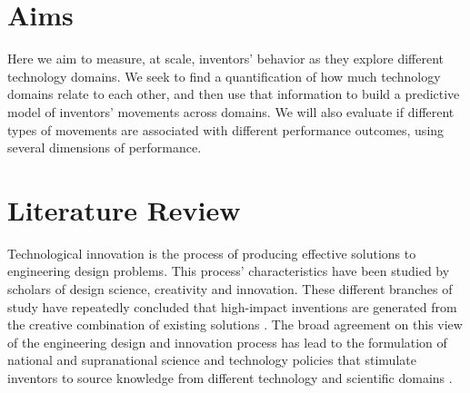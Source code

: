 \documentclass{dsj}
\begin{document}
\section*{Aims}
Here we aim to measure, at scale, inventors' behavior as they explore different technology domains. We seek to find a quantification of how much technology domains relate to each other, and then use that information to build a predictive model of inventors' movements across domains. We will also evaluate if different types of movements are associated with different performance outcomes, using several dimensions of performance.


\section*{Literature Review}
Technological innovation is the process of producing effective solutions to engineering design problems. This process' characteristics have been studied by scholars of design science, creativity and innovation. These different branches of study have repeatedly concluded that high-impact inventions are generated from the creative combination of existing solutions 
\cite{Weisberg2006, Arthur2009, Hatchuel2009, Tang2013, Uzzi2013, Fleming2001, Hatchuel2003, Hatchuel2004}. The broad agreement on this view of the engineering design and innovation process has lead to the formulation of national and supranational science and technology policies that stimulate inventors to source knowledge from different technology and scientific domains \cite{Clough2004, Olson2013,EURAB2004}.
\end{document}
